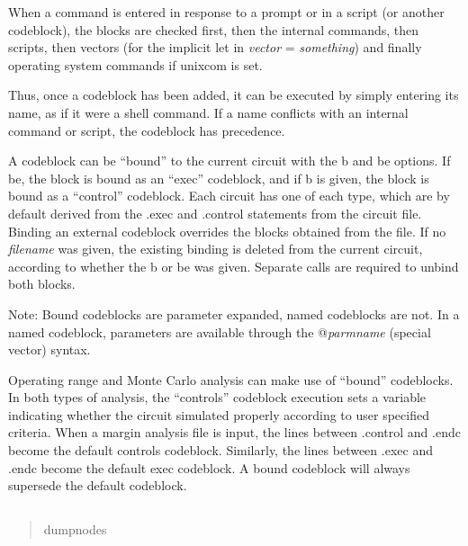 When a command is entered in response to a prompt or in a script (or
another codeblock), the blocks are checked first, then the {\WRspice}
internal commands, then scripts, then vectors (for the implicit {\cb
let} in {\it vector} = {\it something\/}) and finally operating system
commands if {\et unixcom} is set.

Thus, once a codeblock has been added, it can be executed by simply
entering its name, as if it were a shell command.  If a name conflicts
with an internal command or script, the codeblock has precedence.

A codeblock can be ``bound'' to the current circuit with the {\vt b}
and {\vt be} options.  If {\vt be}, the block is bound as an ``exec''
codeblock, and if {\vt b} is given, the block is bound as a
``control'' codeblock.  Each circuit has one of each type, which are
by default derived from the {\vt .exec} and {\vt .control} statements
from the circuit file.  Binding an external codeblock overrides the
blocks obtained from the file.  If no {\it filename} was given, the
existing binding is deleted from the current circuit, according to
whether the {\vt b} or {\vt be} was given.  Separate calls are
required to unbind both blocks.

Note:  Bound codeblocks are parameter expanded, named codeblocks
are not.  In a named codeblock, parameters are available through
the {\vt @}{\it parmname} (special vector) syntax.

Operating range and Monte Carlo analysis can make use of ``bound''
codeblocks.  In both types of analysis, the ``controls'' codeblock
execution sets a variable indicating whether the circuit simulated
properly according to user specified criteria.  When a margin analysis
file is input, the lines between {\vt .control} and {\vt .endc} become
the default controls codeblock.  Similarly, the lines between {\vt
.exec} and {\vt .endc} become the default exec codeblock.  A bound
codeblock will always supersede the default codeblock.

\subsection{}


\begin{quote}\vt
dumpnodes
\end{quote}

